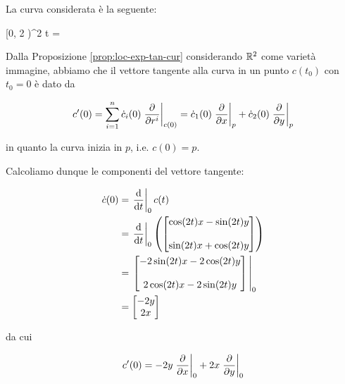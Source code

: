 {
La curva considerata è la seguente:

	{[0, 2 \pi)}{\R^{2}}
	{t}{%
		= %
		}

Dalla Proposizione \ref{prop:loc-exp-tan-cur} considerando $ \mathbb{R}^{2} $ come varietà immagine, abbiamo che il vettore tangente alla curva in un punto $ c(t_{0}) $ con $ t_{0} = 0 $ è dato da

\begin{equation}
	c'(0) = \sum_{i=1}^{n} \dot{c}_{i}(0) \eval{ \pdv{r^{i}} }_{c(0)} %
	= \dot{c}_{1}(0) \eval{ \pdv{x} }_{p} + \dot{c}_{2}(0) \eval{ \pdv{y} }_{p}
\end{equation}

in quanto la curva inizia in $ p $, i.e. $ c(0) = p $.

Calcoliamo dunque le componenti del vettore tangente:

\begin{align}
	\begin{split}
		\dot{c}(0) &= \eval{ \dv{t} }_{0} c(t) \\
		&= \eval{ \dv{t} }_{0} \left( \bmqty{ \cos(2t) x - \sin(2t) y \\ \\ \sin(2t) x + \cos(2t) y } \right) \\
		&= \eval{ \bmqty{ - 2 \sin(2t) x - 2 \cos(2t) y \\ \\ 2 \cos(2t) x - 2 \sin(2t) y } }_{0} \\
		&= \bmqty{ - 2 y \\ 2x }
	\end{split}
\end{align}

da cui

\begin{equation}
	c'(0) = - 2 y \eval{ \pdv{x} }_{0} + 2 x \eval{ \pdv{y} }_{0}
\end{equation}
}


